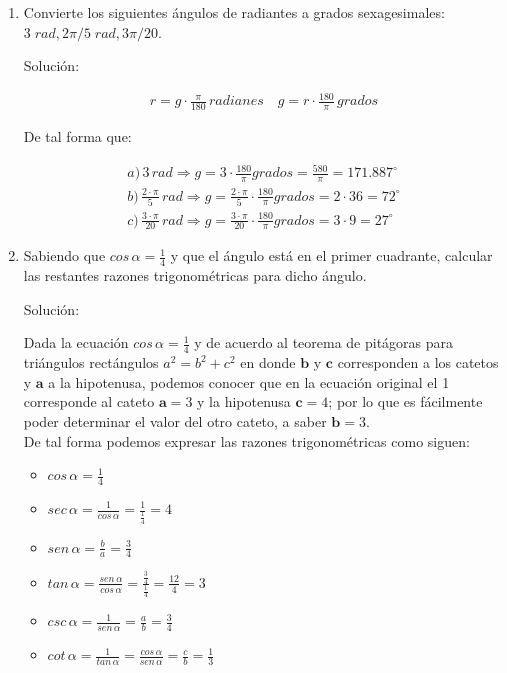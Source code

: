 \documentclass[11pt,letterpaper]{article}
\begin{document}
\begin{enumerate}
	\item Convierte los siguientes ángulos de radiantes a grados sexagesimales: $3\;rad, 2\pi/5\;rad, 3\pi/20$. 

	Solución:
	
	\begin{align*}
		\boxed{ r = g \cdot \frac{\pi}{180}\,radianes} \quad \boxed{ g = r \cdot \frac{180}{\pi}\,grados}
	\end{align*}
	
	De tal forma que:
	
	\begin{align}
		a)\,3\,rad \Rightarrow g = 3 \cdot \frac{180}{\pi} grados = \frac{580}{\pi} = 171.887^{\circ}\\
		b)\,\frac{2 \cdot \pi}{5}\,rad \Rightarrow g = \frac{2 \cdot \pi}{5} \cdot \frac{180}{\pi} grados = 2 \cdot 36 = 72^{\circ}\\
		c)\,\frac{3 \cdot \pi}{20}\,rad \Rightarrow g = \frac{3 \cdot \pi}{20} \cdot \frac{180}{\pi} grados = 3 \cdot 9 = 27^{\circ}
	\end{align}
	
	\item Sabiendo que $cos\,\alpha=\frac{1}{4}$ y que el ángulo está en el primer cuadrante, calcular las restantes razones trigonométricas para dicho ángulo.

	Solución:
	
	Dada la ecuación $cos\,\alpha = \frac{1}{4}$ y de acuerdo al teorema de pitágoras para triángulos rectángulos $a^2 = b^2 + c^2$ en donde $\textbf{b}$ y $\textbf{c}$ 
	corresponden a los catetos y $\textbf{a}$ a la hipotenusa, podemos conocer que en la ecuación original el 1 corresponde al cateto $\textbf{a} = 3$ y la hipotenusa $\textbf{c} = 4$; 
	por lo que es fácilmente poder determinar el valor del otro cateto, a saber $\textbf{b} = 3$. \\
	
	De tal forma podemos expresar las razones trigonométricas como siguen:
	
	\begin{itemize}
		\item $cos\,\alpha = \frac{1}{4}$
		\item $sec\,\alpha = \frac{1}{cos\,\alpha} = \frac{1}{\frac{1}{4}} = 4$
		\item $sen\,\alpha = \frac{b}{a} = \frac{3}{4}$
		\item $tan\,\alpha = \frac{sen\,\alpha}{cos\,\alpha} = \frac{\frac{3}{4}}{\frac{1}{4}} = \frac{12}{4} = 3$
		\item $csc\,\alpha = \frac{1}{sen\,\alpha} = \frac{a}{b} = \frac{3}{4}$
		\item $cot\,\alpha = \frac{1}{tan\,\alpha} = \frac{cos\,\alpha}{sen\,\alpha} = \frac{c}{b} = \frac{1}{3}$
	\end{itemize}


\end{enumerate}
\end{document}
